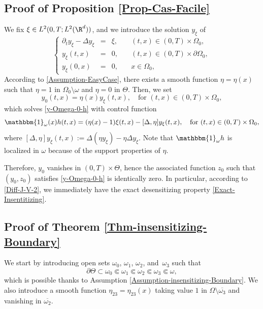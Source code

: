 \subsection{Proof of Proposition \ref{Prop-Cas-Facile}}
\label{Sec-Proof-Prop-Cas-Facile}
We fix $\xi \in L^2(0,T; L^2(\R^d))$, and we introduce the solution $y_\xi$ of
\begin{equation*}
\left\{
\begin{array}{rcll}
\partial_t y_\xi - \Delta y_\xi &=& \xi, \quad & (t,x) \in (0,T) \times \Omega_0,
\\
y_\xi(t, x) &=& 0, \quad & (t,x) \in (0,T) \times \partial \Omega_0,
\\
y_\xi(0,x) &=& 0, \quad & x \in \Omega_0,
\end{array}
\right.
\end{equation*}
According to \eqref{Assumption-EasyCase}, there exists a smooth function $\eta = \eta(x)$ such that $\eta = 1$ in $\Omega_0 \setminus \omega$ and $\eta=0$ in $\Theta$. Then, we set
\[
y_0(t,x) = \eta(x) y_\xi(t,x), \quad \text{for } (t,x) \in (0,T) \times \Omega_0,
\]
which solves \eqref{y-Omega-0-h} with control function
\[
\mathbbm{1}_{\omega}(x)h(t,x) = (\eta(x) -1) \xi(t,x) - [\Delta, \eta] y_\xi(t,x), \quad \text{for } (t,x) \in (0,T) \times \Omega_0,
\]
where $[\Delta, \eta] y_\xi(t,x):=\Delta (\eta y_\xi)-\eta \Delta y_\xi$. Note that $\mathbbm{1}_{\omega} h$ is localized in $\omega$ because of the support properties of $\eta$.

Therefore, $y_0$ vanishes in $(0,T) \times \Theta$, hence the associated function $z_0$ such that $(y_0,z_0)$ satisfies \eqref{y-Omega-0-h} is identically zero. In particular, according to \eqref{Diff-J-V-2}, we immediately have the exact desensitizing property \eqref{Exact-Insentitizing}.

\subsection{Proof of Theorem \ref{Thm-insensitizing-Boundary}}
\label{Sec-Proof-Thm-insensitizing-Boundary}

We start by introducing open sets $\omega_0$, $\omega_1$, $\omega_2$, and~$\omega_3$ such that
\begin{equation*}
\partial \Theta \subset \omega_0 \Subset \omega_1 \Subset \omega_2 \Subset \omega_3 \Subset \omega,
\end{equation*}
which is possible thanks to Assumption \eqref{Assumption-insensitizing-Boundary}.
We also introduce a smooth function $\eta_{23} = \eta_{23}(x)$ taking value $1$ in $\Omega \setminus \overline{\omega_3}$ and vanishing in $\overline{\omega_2}$.

